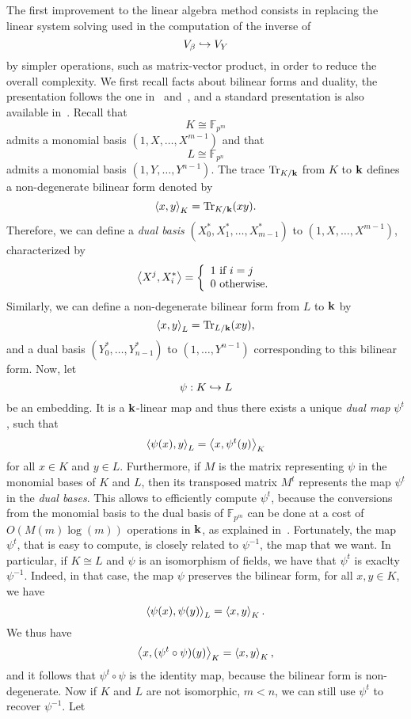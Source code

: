 The first improvement to the linear algebra method consists in replacing the
linear system solving used in the computation of the inverse of
\[
  V_\beta\hookrightarrow V_Y
\]
by simpler operations, such as matrix-vector product, in order to reduce the
overall complexity. We first recall facts about bilinear forms and duality, the
presentation follows the one in~\cite{BDDFS17} and~\cite{DDS14}, and a standard
presentation is also available in~\cite{Lang04}. Recall that
\[
  K\cong\mathbb{F}_{p^m}
\]
admits a monomial basis $(1, X, \dots, X^{m-1})$ and that
\[
  L\cong\mathbb{F}_{p^n}
\]
admits a monomial basis $(1, Y, \dots, Y^{n-1})$. The trace $\operatorname{Tr}_{K/\mathbf{k}}$ from $K$ to
$\mathbf{k}$ defines a non-degenerate bilinear form denoted by
\[
  \left\langle x,y\right\rangle_K = \operatorname{Tr}_{K/\mathbf{k}}(xy).
\]
Therefore, we can define a \emph{dual basis} $(X_0^*, X_1^*, \dots, X_{m-1}^*)$
to $(1, X, \dots, X^{m-1})$, characterized by
\[
  \left\langle X^j,X_i^*\right\rangle=\left\{\begin{array}{l}
    1\text{ if }i=j\\
    0\text{ otherwise.}
  \end{array}\right.
\]
Similarly, we can define a non-degenerate bilinear form from $L$ to $\mathbf{k}$ by
\[
  \left\langle x,y\right\rangle_L = \operatorname{Tr}_{L/\mathbf{k}}(xy),
\]
and a dual basis $(Y_0^*, \dots, Y_{n-1}^*)$ to $(1, \dots, Y^{n-1})$
corresponding to this bilinear form. Now, let
\[
  \psi:K\hookrightarrow L
\]
be an embedding. It is a $\mathbf{k}$-linear map and thus there exists a unique
\emph{dual map} $\psi^t$, such that
\[
  \left\langle\psi(x),y\right\rangle_L = \left\langle x,\psi^t(y)\right\rangle_K
\]
for all $x\in K$ and $y\in L$. Furthermore, if $M$ is the matrix representing
$\psi$ in the monomial bases of $K$ and $L$, then its transposed matrix $M^t$
represents the map $\psi^t$ in the \emph{dual bases}. This allows to efficiently compute
$\psi^t$, because the conversions from the monomial basis to the dual basis of
$\mathbb{F}_{p^m}$ can be done at a cost of $O(M(m)\log(m))$ operations in $\mathbf{k}$,
as explained in~\cite{DDS14}. Fortunately, the map $\psi^t$, that is easy to
compute, is closely related to $\psi^{-1}$, the map that we want. In particular, if
$K\cong L$ and $\psi$ is an isomorphism of fields, we have that $\psi^t$ is
exaclty $\psi^{-1}$. Indeed, in that case, the map $\psi$ preserves the bilinear
form, \ie for all $x, y\in K$, we have
\[
  \left\langle\psi(x),\psi(y)\right\rangle_L = \left\langle x,y\right\rangle_K.
\]
We thus have
\[
  \left\langle x,(\psi^t\circ\psi)(y)\right\rangle_K = \left\langle x,y\right\rangle_K,
\]
and it follows that $\psi^t\circ\psi$ is the identity map, because the bilinear
form is non-degenerate. Now if $K$ and $L$ are not isomorphic, \ie $m<n$, we can
still use $\psi^t$ to recover $\psi^{-1}$. Let 
